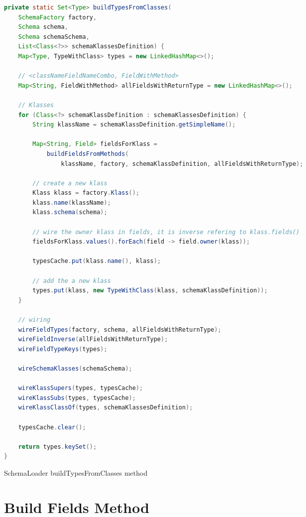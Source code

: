 \begin{sourcecode} [H]
	\begin{lstlisting}[language=Java, escapechar=|]
private static Set<Type> buildTypesFromClasses(
	SchemaFactory factory,
	Schema schema,
	Schema schemaSchema,
	List<Class<?>> schemaKlassesDefinition) {
	Map<Type, TypeWithClass> types = new LinkedHashMap<>();

	// <classNameFieldNameCombo, FieldWithMethod>
	Map<String, FieldWithMethod> allFieldsWithReturnType = new LinkedHashMap<>();

	// Klasses
	for (Class<?> schemaKlassDefinition : schemaKlassesDefinition) {
		String klassName = schemaKlassDefinition.getSimpleName();

		Map<String, Field> fieldsForKlass =
			buildFieldsFromMethods(
				klassName, factory, schemaKlassDefinition, allFieldsWithReturnType);

		// create a new klass
		Klass klass = factory.Klass();
		klass.name(klassName);
		klass.schema(schema);

		// wire the owner klass in fields, it is inverse refering to klass.fields()
		fieldsForKlass.values().forEach(field -> field.owner(klass));

		typesCache.put(klass.name(), klass);

		// add the a new klass
		types.put(klass, new TypeWithClass(klass, schemaKlassDefinition));
	}

	// wiring
	wireFieldTypes(factory, schema, allFieldsWithReturnType);
	wireFieldInverse(allFieldsWithReturnType);
	wireFieldTypeKeys(types);

	wireSchemaKlasses(schemaSchema);

	wireKlassSupers(types, typesCache);
	wireKlassSubs(types, typesCache);
	wireKlassClassOf(types, schemaKlassesDefinition);

	typesCache.clear();

	return types.keySet();
}
    \end{lstlisting}
	\caption{SchemaLoader buildTypesFromClasses method}
	\label{lst:SchemaLoader_buildTypesFromClasses}
\end{sourcecode}

\section{Build Fields Method}

